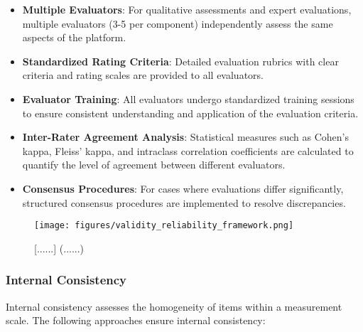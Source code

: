\documentclass[12pt, a4paper, oneside]{book}
\begin{document}
\begin{itemize}[leftmargin=*]
    \item \textbf{Multiple Evaluators}: For qualitative assessments and expert evaluations, multiple evaluators (3-5 per component) independently assess the same aspects of the platform.

    \item \textbf{Standardized Rating Criteria}: Detailed evaluation rubrics with clear criteria and rating scales are provided to all evaluators.

    \item \textbf{Evaluator Training}: All evaluators undergo standardized training sessions to ensure consistent understanding and application of the evaluation criteria.

    \item \textbf{Inter-Rater Agreement Analysis}: Statistical measures such as Cohen's kappa, Fleiss' kappa, and intraclass correlation coefficients are calculated to quantify the level of agreement between different evaluators.

    \item \textbf{Consensus Procedures}: For cases where evaluations differ significantly, structured consensus procedures are implemented to resolve discrepancies.
\end{itemize}

\begin{figure}[htbp]
    \centering
    \texttt{[image: figures/validity\_reliability\_framework.png]}
    \caption{[......] (......)}
    \label{fig:validity_reliability}
\end{figure}

\subsubsection{Internal Consistency}
Internal consistency assesses the homogeneity of items within a measurement scale. The following approaches ensure internal consistency:
\end{document}
